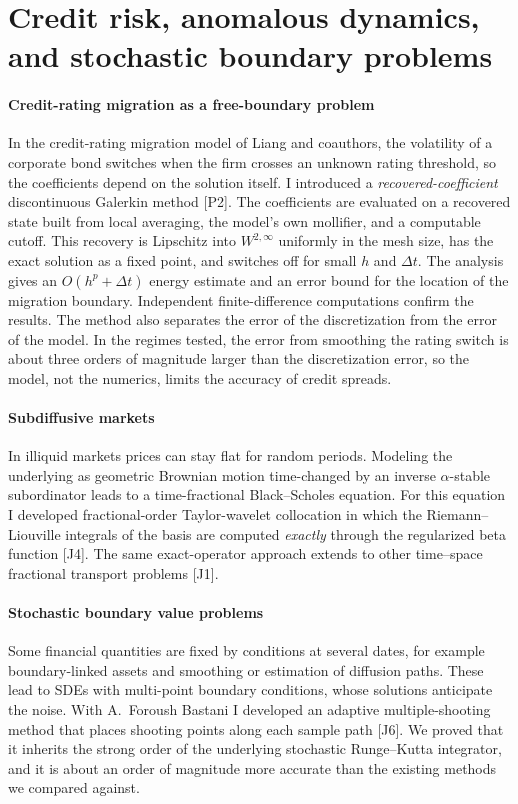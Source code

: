 \documentclass[11pt]{article}
\newcommand{\rc}[1]{\textcolor{accent}{[#1]}}
\begin{document}
\section{Credit risk, anomalous dynamics, and stochastic boundary problems}

\paragraph{Credit-rating migration as a free-boundary problem}
In the credit-rating migration model of Liang and coauthors, the volatility
of a corporate bond switches when the firm crosses an unknown rating
threshold, so the coefficients depend on the solution itself. I introduced
a \emph{recovered-coefficient} discontinuous Galerkin method \rc{P2}. The
coefficients are evaluated on a recovered state built from local
averaging, the model's own mollifier, and a computable cutoff. This
recovery is Lipschitz into $W^{2,\infty}$ uniformly in the mesh size, has
the exact solution as a fixed point, and switches off for small $h$ and
$\Delta t$. The analysis gives an $O(h^p+\Delta t)$ energy estimate and an
error bound for the location of the migration boundary. Independent
finite-difference computations confirm the results. The method also
separates the error of the discretization from the error of the model. In
the regimes tested, the error from smoothing the rating switch is about
three orders of magnitude larger than the discretization error, so the
model, not the numerics, limits the accuracy of credit spreads.

\paragraph{Subdiffusive markets}
In illiquid markets prices can stay flat for random periods. Modeling the
underlying as geometric Brownian motion time-changed by an inverse
$\alpha$-stable subordinator leads to a time-fractional Black--Scholes
equation. For this equation I developed fractional-order Taylor-wavelet
collocation in which the Riemann--Liouville integrals of the basis are
computed \emph{exactly} through the regularized beta function \rc{J4}. The
same exact-operator approach extends to other time--space fractional
transport problems \rc{J1}.

\paragraph{Stochastic boundary value problems}
Some financial quantities are fixed by conditions at several dates, for
example boundary-linked assets and smoothing or estimation of diffusion
paths. These lead to SDEs with multi-point boundary conditions, whose
solutions anticipate the noise. With A.~Foroush Bastani I developed an
adaptive multiple-shooting method that places shooting points along each
sample path \rc{J6}. We proved that it inherits the strong order of the
underlying stochastic Runge--Kutta integrator, and it is about an order of
magnitude more accurate than the existing methods we compared against.
\end{document}
